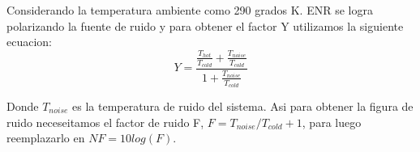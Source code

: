 Considerando la temperatura ambiente como 290 grados K. ENR se logra polarizando la fuente de ruido y para obtener el factor Y utilizamos la siguiente ecuacion:\\

\begin{equation}
    Y = \frac{\frac{T_{hot}}{T_{cold}} + \frac{T_{noise}}{T_{cold}}}{1 + \frac{T_{noise}}{T_{cold}}}
\end{equation}

Donde $T_{noise}$ es la temperatura de ruido del sistema. Asi para obtener la figura de ruido neceseitamos el factor de ruido F, $F=T_{noise}/T_{cold} +1 $, para luego reemplazarlo en $NF = 10log(F)$\cite{analogNoiseFigure}.\\










